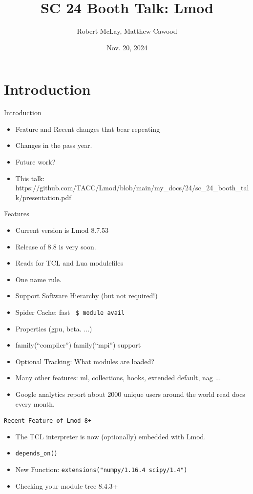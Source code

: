 \documentclass{beamer}
\begin{document}
\title[Lmod]{SC 24 Booth Talk: Lmod}
\author{Robert McLay, Matthew Cawood} 
\date{Nov. 20, 2024}

\frame{\titlepage} 

\section{Introduction}

\begin{frame}{Introduction}
  \begin{itemize}
    \item Feature and Recent changes that bear repeating
    \item Changes in the pass year.
    \item Future work?
    \item This talk: https://github.com/TACC/Lmod/blob/main/my\_docs/24/sc\_24\_booth\_talk/presentation.pdf
  \end{itemize}
\end{frame}

\begin{frame}{Features}
  \begin{itemize}
    \item Current version is Lmod 8.7.53
    \item Release of 8.8 is very soon.
    \item Reads for TCL and Lua modulefiles
    \item One name rule.
    \item Support Software Hierarchy (but not required!)
    \item Spider Cache: fast \texttt{\color{blue} \$ module avail}
    \item Properties (gpu, beta. ...)
    \item family(``compiler'') family(``mpi'') support
    \item Optional Tracking: What modules are loaded?
    \item Many other features: ml, collections, hooks,
      extended default, nag ...
    \item Google analytics report about 2000 unique users around the
      world read docs every month.
  \end{itemize}
\end{frame}

\begin{frame}{\texttt{Recent Feature of Lmod 8+}}
  \begin{itemize}
    \item The TCL interpreter is now (optionally) embedded with Lmod.
    \item \texttt{depends\_on()}
    \item New Function: \texttt{extensions("numpy/1.16.4 scipy/1.4")}
    \item Checking your module tree 8.4.3+
  \end{itemize}
\end{frame}
\end{document}
